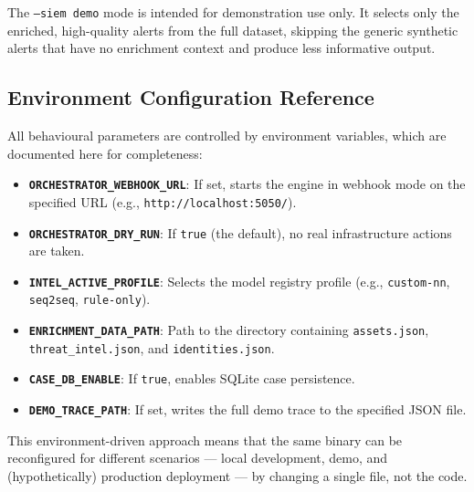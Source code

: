 The \texttt{--siem demo} mode is intended for demonstration use only. It selects only the enriched, high-quality alerts from the full dataset, skipping the generic synthetic alerts that have no enrichment context and produce less informative output.

\subsection{Environment Configuration Reference}

All behavioural parameters are controlled by environment variables, which are documented here for completeness:

\begin{itemize}
    \item \textbf{\texttt{ORCHESTRATOR\_WEBHOOK\_URL}}: If set, starts the engine in webhook mode on the specified URL (e.g., \texttt{http://localhost:5050/}).
    \item \textbf{\texttt{ORCHESTRATOR\_DRY\_RUN}}: If \texttt{true} (the default), no real infrastructure actions are taken.
    \item \textbf{\texttt{INTEL\_ACTIVE\_PROFILE}}: Selects the model registry profile (e.g., \texttt{custom-nn}, \texttt{seq2seq}, \texttt{rule-only}).
    \item \textbf{\texttt{ENRICHMENT\_DATA\_PATH}}: Path to the directory containing \texttt{assets.json}, \texttt{threat\_intel.json}, and \texttt{identities.json}.
    \item \textbf{\texttt{CASE\_DB\_ENABLE}}: If \texttt{true}, enables SQLite case persistence.
    \item \textbf{\texttt{DEMO\_TRACE\_PATH}}: If set, writes the full demo trace to the specified JSON file.
\end{itemize}

This environment-driven approach means that the same binary can be reconfigured for different scenarios --- local development, demo, and (hypothetically) production deployment --- by changing a single file, not the code.
